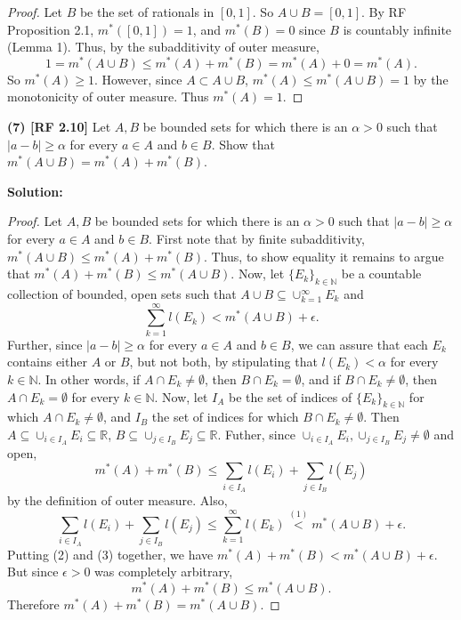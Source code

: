 \documentclass[12pt]{article}
\begin{document}
\begin{proof}
  Let $B$ be the set of rationals in $[0,1]$. So $A\cup B = [0,1]$. By RF
  Proposition 2.1, $m^{*}([0,1]) = 1$, and $m^{*}(B) = 0$ since $B$ is countably
infinite (Lemma 1). Thus, by the subadditivity of outer
  measure,
  \[ 1 = m^{*}(A\cup B) \leq m^{*}(A) + m^{*}(B) = m^{*}(A) + 0 = m^{*}(A). \]
  So $m^{*}(A) \geq 1$. However, since $A\subset A \cup B$, $m^{*}(A) \leq
  m^{*}(A\cup B) = 1$ by the monotonicity of outer measure. Thus $m^{*}(A) = 1$.
\end{proof}

{\bf (7) [RF 2.10]} Let $A,B$ be bounded sets for which there is an $\alpha > 0$
such that $|a-b| \geq \alpha$ for every $a\in A$ and $b \in B$. Show that
$m^{*}(A\cup B) = m^{*}(A) + m^{*}(B)$.

{\bf Solution:}

\begin{proof}
Let $A,B$ be bounded sets for which there is an $\alpha > 0$
such that $|a-b| \geq \alpha$ for every $a\in A$ and $b \in B$.
First note that by finite subadditivity, $m^{*}(A\cup B) \leq m^{*}(A) +
m^{*}(B)$. Thus, to show equality it remains to argue that $m^{*}(A) +
m^{*}(B) \leq m^{*}(A\cup B)$. Now, let $\{E_{k}\}_{k\in\mathbb{N}}$ be a
countable collection of bounded, open sets such that $A\cup B \subseteq
\cup_{k=1}^{\infty}E_{k}$ and 
\begin{equation}
\sum_{k=1}^{\infty}l(E_{k}) < m^{*}(A\cup B) + \epsilon.
\end{equation}
Further, since $|a-b| \geq \alpha$ for every $a \in A$ and $b \in B$, we can
assure that each $E_{k}$ contains either $A$ or $B$, but not both, by
stipulating that $l(E_{k}) < \alpha$ for every $k \in \mathbb{N}$. In other
words, if $A \cap E_{k} \neq \emptyset$, then $B\cap E_{k} = \emptyset$, and if
$B\cap E_{k} \neq \emptyset$, then $A\cap E_{k} = \emptyset$ for every $k \in
\mathbb{N}$. Now, let $I_{A}$ be the set of indices of
$\{E_{k}\}_{k\in\mathbb{N}}$ for which $A\cap E_{k} \neq \emptyset$, and $I_{B}$
the set of indices for which $B\cap E_{k} \neq \emptyset$. Then 
$A \subseteq \cup_{i\in I_{A}} E_{i} \subseteq \mathbb{R}$, $B \subseteq \cup_{j\in I_{B}}
E_{j} \subseteq \mathbb{R}$. Futher, since $\cup_{i \in I_{A}}E_{i}, \cup_{j\in I_{B}}E_{j} \neq \emptyset$ and open,
\begin{equation}
m^{*}(A) + m^{*}(B) \leq \sum_{i \in I_{A}}l(E_{i}) + \sum_{j\in I_{B}}l(E_{j})
\end{equation}
by the definition of outer measure. Also,
\begin{equation}
\sum_{i \in I_{A}}l(E_{i}) + \sum_{j\in I_{B}}l(E_{j}) \leq
\sum_{k=1}^{\infty}l(E_{k}) \stackrel{(1)}{<} m^{*}(A\cup B) + \epsilon.
\end{equation}
Putting (2) and (3) together, we have $m^{*}(A) + m^{*}(B) < m^{*}(A\cup B) +
\epsilon$. But since $\epsilon > 0$ was completely arbitrary, 
\[ m^{*}(A) + m^{*}(B) \leq m^{*}(A\cup B). \]
Therefore $m^{*}(A) + m^{*}(B) = m^{*}(A\cup B)$.
\end{proof}
\end{document}
